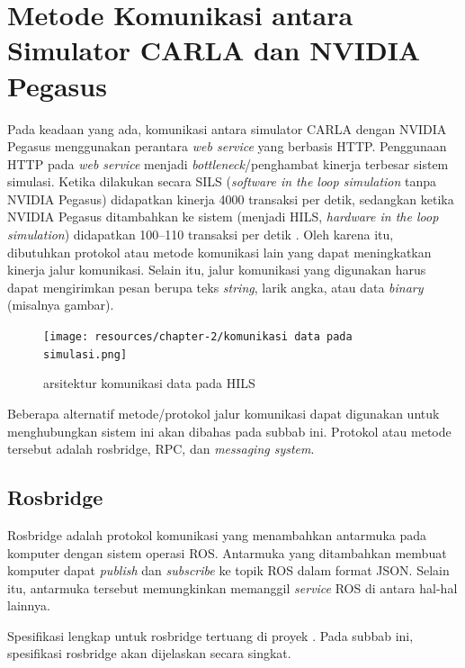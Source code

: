 \section{Metode Komunikasi antara Simulator CARLA dan NVI\-DI\-A Pegasus}

Pada keadaan yang ada, komunikasi antara simulator CARLA dengan NVIDIA Pegasus
menggunakan perantara \textit{web service} yang berbasis HTTP. Penggunaan HTTP
pada \textit{web service} menjadi \textit{bottleneck}/penghambat kinerja
terbesar sistem simulasi. Ketika dilakukan secara SILS (\textit{software in the
    loop simulation} tanpa NVIDIA Pegasus) didapatkan kinerja 4000 transaksi per
detik, sedangkan ketika NVIDIA Pegasus ditambahkan ke sistem (menjadi HILS,
\textit{hardware in the loop simulation}) didapatkan 100--110 transaksi per
detik \parencite{trilaksono_laporanRispro}. Oleh karena itu, dibutuhkan protokol
atau metode komunikasi lain yang dapat meningkatkan kinerja jalur komunikasi.
Selain itu, jalur komunikasi yang digunakan harus dapat mengirimkan pesan berupa
teks \textit{string}, larik angka, atau data \textit{binary} (misalnya gambar).

\begin{figure}
    \begin{center}
        \texttt{[image: resources/chapter-2/komunikasi
            data pada simulasi.png]}
        \caption{arsitektur komunikasi data pada HILS
            \parencite{trilaksono_laporanRispro}}
    \end{center}
\end{figure}

Beberapa alternatif metode/protokol jalur komunikasi dapat digunakan untuk
meng\-hu\-bung\-kan sistem ini akan dibahas pada subbab ini. Protokol atau
metode tersebut adalah rosbridge, RPC, dan \textit{messaging system}.

\subsection{Rosbridge}

Rosbridge adalah protokol komunikasi yang menambahkan antarmuka pada komputer
dengan sistem operasi ROS. Antarmuka yang ditambahkan membuat komputer dapat
\textit{publish} dan \textit{subscribe} ke topik ROS dalam format JSON. Selain
itu, antarmuka tersebut memungkinkan memanggil \textit{service} ROS di antara
hal-hal lainnya.

Spesifikasi lengkap untuk rosbridge tertuang di proyek \parencite{ros_bridge}.
Pada subbab ini, spesifikasi rosbridge akan dijelaskan secara singkat.

